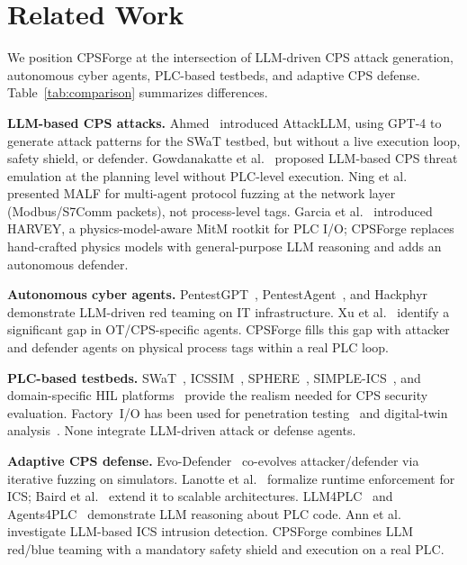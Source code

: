 \section{Related Work}
\label{sec:related}

We position CPSForge at the intersection of LLM-driven CPS attack generation, autonomous cyber agents, PLC-based testbeds, and adaptive CPS defense. Table~\ref{tab:comparison} summarizes differences.

\textbf{LLM-based CPS attacks.} Ahmed~\cite{ahmed2025attackllm} introduced AttackLLM, using GPT-4 to generate attack patterns for the SWaT testbed, but without a live execution loop, safety shield, or defender. Gowdanakatte et al.~\cite{gowdanakatte2025threat} proposed LLM-based CPS threat emulation at the planning level without PLC-level execution. Ning et al.~\cite{ning2025malf} presented MALF for multi-agent protocol fuzzing at the network layer (Modbus/S7Comm packets), not process-level tags. Garcia et al.~\cite{garcia2017harvey} introduced HARVEY, a physics-model-aware MitM rootkit for PLC I/O; CPSForge replaces hand-crafted physics models with general-purpose LLM reasoning and adds an autonomous defender.

\textbf{Autonomous cyber agents.} PentestGPT~\cite{deng2024pentestgpt}, PentestAgent~\cite{shen2025pentestagent}, and Hackphyr~\cite{rigaki2024hackphyr} demonstrate LLM-driven red teaming on IT infrastructure. Xu et al.~\cite{xu2025forewarned} identify a significant gap in OT/CPS-specific agents. CPSForge fills this gap with attacker and defender agents on physical process tags within a real PLC loop.

\textbf{PLC-based testbeds.} SWaT~\cite{mathur2016swat, goh2017swat}, ICSSIM~\cite{dehlaghi2023icssim}, SPHERE~\cite{garcia2025sphere}, SIMPLE-ICS~\cite{pramadi2026simpleics}, and domain-specific HIL platforms~\cite{chen2024nuclear_hil, nam2025hintsec, mathew2024hil_thermal} provide the realism needed for CPS security evaluation. Factory~I/O has been used for penetration testing~\cite{lazaridis2023factoryio_pentest} and digital-twin analysis~\cite{wang2024factoryio_dt}. None integrate LLM-driven attack or defense agents.

\textbf{Adaptive CPS defense.} Evo-Defender~\cite{hu2025evodefender} co-evolves attacker/defender via iterative fuzzing on simulators. Lanotte et al.~\cite{lanotte2022runtime_ics} formalize runtime enforcement for ICS; Baird et al.~\cite{baird2024scalable_enforcement} extend it to scalable architectures. LLM4PLC~\cite{fakih2024llm4plc} and Agents4PLC~\cite{liu2026agents4plc} demonstrate LLM reasoning about PLC code. Ann et al.~\cite{ann2024ids_llm} investigate LLM-based ICS intrusion detection. CPSForge combines LLM red/blue teaming with a mandatory safety shield and execution on a real PLC.

